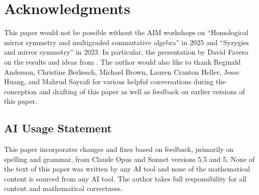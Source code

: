 \documentclass{amsart}
\theoremstyle{remark}
\begin{document}
\section{Acknowledgments}

This paper would not be possible without the AIM workshops on ``Homological mirror symmetry and multigraded commutative algebra'' in 2025 and ``Syzygies and mirror symmetry'' in 2023. In particular, the presentation by David Favero on the results and ideas from \cite{FH25}.
The author would also like to thank Reginald Anderson, Christine Berkesch, Michael Brown, Lauren Cranton Heller, Jesse Huang, and Mahrud Sayrafi for various helpful conversations during the conception and drafting of this paper as well as feedback on earlier versions of this paper.

\subsection*{AI Usage Statement}

This paper incorporates changes and fixes based on feedback, primarily on spelling and grammar, from Claude Opus and Sonnet versions 5.5 and 5. None of the text of this paper was written by any AI tool and none of the mathematical content is sourced from any AI tool. The author takes full responsibility for all content and mathematical correctness.

\end{document}
